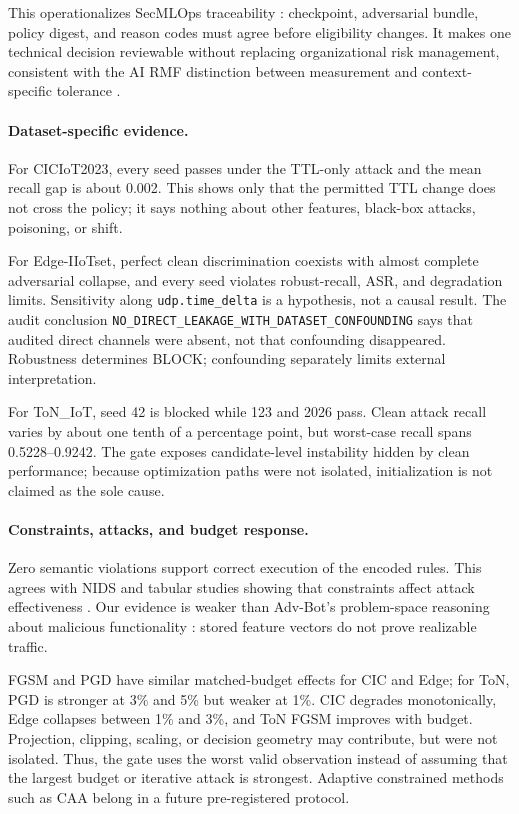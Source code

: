 \documentclass[runningheads]{llncs}
\begin{document}
This operationalizes SecMLOps traceability \cite{zhang2022secmlops,zhang2026secmlops}: checkpoint, adversarial bundle, policy digest, and reason codes must agree before eligibility changes. It makes one technical decision reviewable without replacing organizational risk management, consistent with the AI RMF distinction between measurement and context-specific tolerance \cite{tabassi2023airmf}.

\paragraph{Dataset-specific evidence.}
For CICIoT2023, every seed passes under the TTL-only attack and the mean recall gap is about 0.002. This shows only that the permitted TTL change does not cross the policy; it says nothing about other features, black-box attacks, poisoning, or shift.

For Edge-IIoTset, perfect clean discrimination coexists with almost complete adversarial collapse, and every seed violates robust-recall, ASR, and degradation limits. Sensitivity along \texttt{udp.time\_delta} is a hypothesis, not a causal result. The audit conclusion \texttt{NO\_DIRECT\_LEAKAGE\_WITH\_DATASET\_CONFOUNDING} says that audited direct channels were absent, not that confounding disappeared. Robustness determines BLOCK; confounding separately limits external interpretation.

For ToN\_IoT, seed 42 is blocked while 123 and 2026 pass. Clean attack recall varies by about one tenth of a percentage point, but worst-case recall spans 0.5228--0.9242. The gate exposes candidate-level instability hidden by clean performance; because optimization paths were not isolated, initialization is not claimed as the sole cause.

\paragraph{Constraints, attacks, and budget response.}
Zero semantic violations support correct execution of the encoded rules. This agrees with NIDS and tabular studies showing that constraints affect attack effectiveness \cite{alhussien2024constraining,simonetto2024tabularbench}. Our evidence is weaker than Adv-Bot's problem-space reasoning about malicious functionality \cite{debicha2023advbot}: stored feature vectors do not prove realizable traffic.

FGSM and PGD have similar matched-budget effects for CIC and Edge; for ToN, PGD is stronger at 3\% and 5\% but weaker at 1\%. CIC degrades monotonically, Edge collapses between 1\% and 3\%, and ToN FGSM improves with budget. Projection, clipping, scaling, or decision geometry may contribute, but were not isolated. Thus, the gate uses the worst valid observation instead of assuming that the largest budget or iterative attack is strongest. Adaptive constrained methods such as CAA \cite{simonetto2024caa} belong in a future pre-registered protocol.
\end{document}
